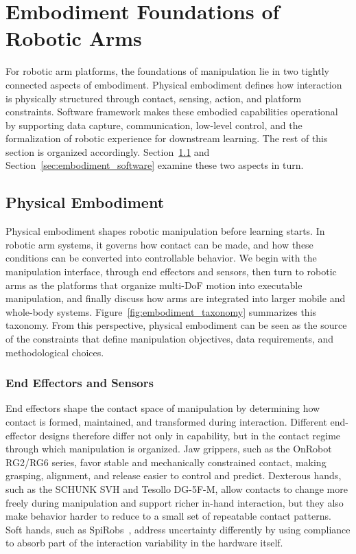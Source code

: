 \documentclass[acmsmall,screen,review]{acmart}
\begin{document}
\section{Embodiment Foundations of Robotic Arms}\label{sec:embodiment_hardware}

For robotic arm platforms, the foundations of manipulation lie in two tightly connected aspects of embodiment. 
Physical embodiment defines how interaction is physically structured through contact, sensing, action, and platform constraints. 
Software framework makes these embodied capabilities operational by supporting data capture, communication, low-level control, and the formalization of robotic experience for downstream learning.
The rest of this section is organized accordingly. Section~\ref{sec:embodiment_physical} and Section~\ref{sec:embodiment_software} examine these two aspects in turn.

\subsection{Physical Embodiment}\label{sec:embodiment_physical}

Physical embodiment shapes robotic manipulation before learning starts. 
In robotic arm systems, it governs how contact can be made, and how these conditions can be converted into controllable behavior.  
We begin with the manipulation interface, through end effectors and sensors, then turn to robotic arms as the platforms that organize multi-DoF motion into executable manipulation, and finally discuss how arms are integrated into larger mobile and whole-body systems.
Figure~\ref{fig:embodiment_taxonomy} summarizes this taxonomy. 
From this perspective, physical embodiment can be seen as the source of the constraints that define manipulation objectives, data requirements, and methodological choices.

\subsubsection{End Effectors and Sensors}\label{subsec:end_effectors}

End effectors shape the contact space of manipulation by determining how contact is formed, maintained, and transformed during interaction.
Different end-effector designs therefore differ not only in capability, but in the contact regime through which manipulation is organized.
Jaw grippers, such as the OnRobot RG2/RG6 series, favor stable and mechanically constrained contact, making grasping, alignment, and release easier to control and predict.
Dexterous hands, such as the SCHUNK SVH and Tesollo DG-5F-M, allow contacts to change more freely during manipulation and support richer in-hand interaction, but they also make behavior harder to reduce to a small set of repeatable contact patterns.
Soft hands, such as SpiRobs~\cite{lee2023spirobs}, address uncertainty differently by using compliance to absorb part of the interaction variability in the hardware itself.
\end{document}
